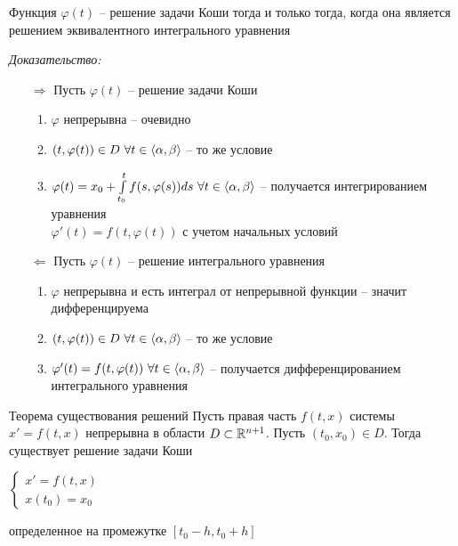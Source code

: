 \documentclass[12pt]{article}
\begin{document}
\begin{lem}{}
    Функция $\varphi(t)$ -- решение задачи Коши тогда и только тогда, когда она является решением эквивалентного интегрального уравнения 
\end{lem}

\textit{Доказательство:}

\begin{itemize}
    \item[$\Rightarrow$] Пусть $\varphi(t)$ -- решение задачи Коши

        \begin{enumerate}
            \item $\varphi$ непрерывна -- очевидно 
            \item $(t, \varphi(t)) \in D\ \forall t \in \langle \alpha, \beta \rangle$ -- то же условие
            \item $\varphi(t) = x_0 + \int\limits_{t_0}^t f(s, \varphi(s))ds\ \forall t \in \langle \alpha, \beta \rangle$ -- получается интегрированием уравнения \\
            $\varphi'(t) = f(t, \varphi(t))$ с учетом начальных условий
        \end{enumerate}
    \item[$\Leftarrow$] Пусть $\varphi(t)$ -- решение интегрального уравнения
    
        \begin{enumerate}
            \item $\varphi$ непрерывна и есть интеграл от непрерывной функции -- значит дифференцируема
            \item $(t, \varphi(t)) \in D\ \forall t \in \langle \alpha, \beta \rangle$ -- то же условие
            \item $\varphi'(t) = f(t, \varphi(t))\ \forall t \in \q{\alpha, \beta}$ -- получается дифференцированием интегрального уравнения
        \end{enumerate}
\end{itemize}

\begin{theo}{Теорема существования решений}
    Пусть правая часть $f(t, x)$ системы $x' = f(t, x)$ непрерывна в области $D \subset \mathbb R^{n + 1}$. Пусть $(t_0, x_0) \in D$. Тогда существует решение задачи Коши 

    $\begin{cases}
        x' = f(t, x) \\
        x(t_0) = x_0
    \end{cases}$

    определенное на промежутке $[t_0 - h, t_0 + h]$
\end{theo}
\end{document}
